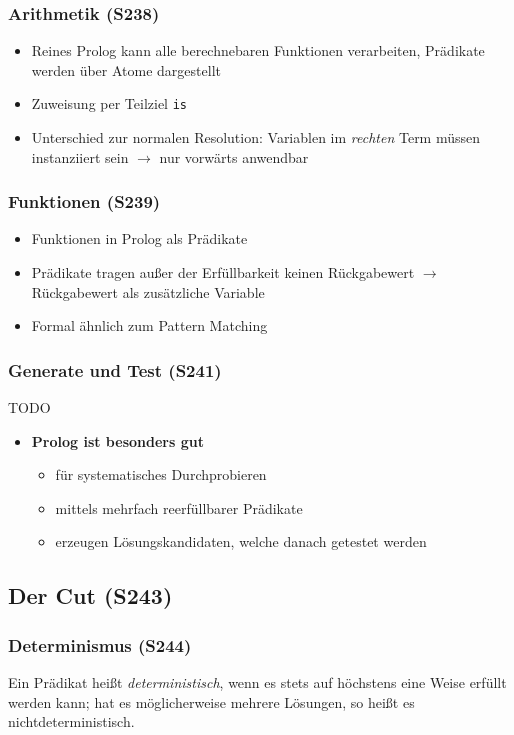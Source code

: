\subsubsection{Arithmetik (S238)}
\begin{itemize}
	\item Reines Prolog kann alle berechnebaren Funktionen verarbeiten, Prädikate werden über Atome dargestellt
	\item Zuweisung per Teilziel \texttt{is}
	\item Unterschied zur normalen Resolution: Variablen im \textit{rechten} Term müssen instanziiert sein \(\rightarrow\) nur vorwärts anwendbar
\end{itemize}

\subsubsection{Funktionen (S239)}
\begin{itemize}
	\item Funktionen in Prolog als Prädikate
	\item Prädikate tragen außer der Erfüllbarkeit keinen Rückgabewert \(\rightarrow\) Rückgabewert als zusätzliche Variable
	\item Formal ähnlich zum Pattern Matching
\end{itemize}

\subsubsection{Generate und Test (S241)}
TODO
\begin{itemize}
	\item \textbf{Prolog ist besonders gut}
	\begin{itemize}
		\item für systematisches Durchprobieren
		\item mittels mehrfach reerfüllbarer Prädikate
		\item erzeugen Lösungskandidaten, welche danach getestet werden
	\end{itemize}
\end{itemize}


\subsection{Der Cut (S243)}

\subsubsection{Determinismus (S244)}
Ein Prädikat heißt \textit{deterministisch}, wenn es stets auf höchstens eine Weise erfüllt werden kann; hat es möglicherweise mehrere Lösungen, so heißt es nichtdeterministisch.

